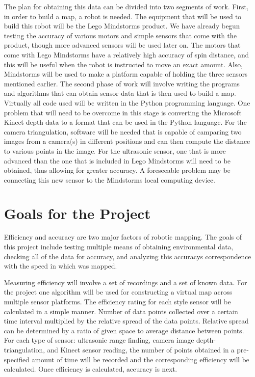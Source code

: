 \documentclass{article}
\begin{document}
	The plan for obtaining this data can be divided into two
        segments of work.  First, in order to build a map, a robot is
        needed.  The equipment that will be used to build this robot
        will be the Lego Mindstorms product.  We have already begun
        testing the accuracy of various motors and simple sensors that
        come with the product, though more advanced sensors will be
        used later on.  The motors that come with Lego Mindstorms have
        a relatively high accuracy of spin distance, and this will be
        useful when the robot is instructed to move an exact amount.
        Also, Mindstorms will be used to make a platform capable of
        holding the three sensors mentioned earlier.  The second phase
        of work will involve writing the programs and algorithms that
        can obtain sensor data that is then used to build a map.
        Virtually all code used will be written in the Python
        programming language.  One problem that will need to be
        overcome in this stage is converting the Microsoft Kinect
        depth data to a format that can be used in the Python
        language.  For the camera triangulation, software will be
        needed that is capable of camparing two images from a
        camera(s) in different positions and can then compute the
        distance to various points in the image.  For the ultrasonic
        sensor, one that is more advanced than the one that is
        included in Lego Mindstorms will need to be obtained, thus
        allowing for greater accuracy.  A foreseeable problem may be
        connecting this new sensor to the Mindstorms local computing
        device.  


\section{Goals for the Project}\label{project}

	Efficiency and accuracy are two major factors of robotic
        mapping.  The goals of this project include testing multiple
        means of obtaining environmental data, checking all of the
        data for accuracy, and analyzing this accuracys correspondence
        with the speed in which was mapped.

	Measuring efficiency will involve a set of recordings and a
        set of known data.  For the project one algorithm will be used
        for constructing a virtual map across multiple sensor
        platforms.   The efficiency rating for each style sensor will
        be calculated in a simple manner.  Number of data points
        collected over a certain time interval multiplied by the
        relative spread of the data points.  Relative spread can be
        determined by a ratio of given space to average distance
        between points.  For each type of sensor: ultrasonic range
        finding, camera image depth-triangulation, and Kinect sensor
        reading, the number of points obtained in a pre-specified
        amount of time will be recorded and the corresponding
        efficiency will be calculated.  Once efficiency is calculated,
        accuracy is next.
\end{document}
